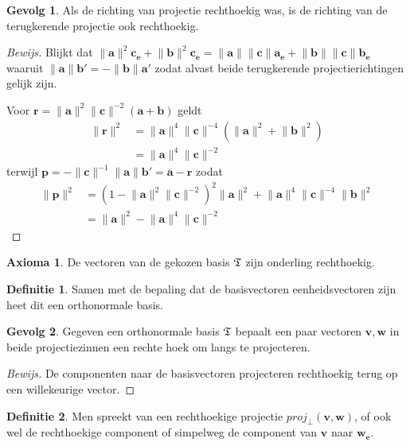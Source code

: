 \documentclass{amsart}
\theoremstyle{definition}
\newtheorem{axm}{Axioma}[section]
\newtheorem{dfn}{Definitie}[section]
\newtheorem{csq}{Gevolg}[section]
\newenvironment{bewijs}{\begin{proof}[Bewijs]}{\end{proof}}
\newcommand{\norm}[1]{\lVert{#1}\rVert}
\newcommand{\vvec}[1][v]{\mathbf{#1}}
\newcommand{\uvec}[1][v]{\vvec[#1]_\mathbf{e}}
\newcommand{\vnorm}[1]{\norm{\vvec[#1]}}
\newcommand{\vecrow}[1][a]{\mathfrak{\MakeUppercase{#1}}}
\begin{document}
\begin{csq}
	Als de richting van projectie rechthoekig was, is de richting van de terugkerende projectie ook rechthoekig.
	\begin{bewijs}
		Blijkt dat $\vnorm a^2\uvec[c] + \vnorm b^2\uvec[c] = \vnorm a\vnorm c\uvec[a] + \vnorm b\vnorm c\uvec[b]$ waaruit $\vnorm a\vvec[b'] = -\vnorm b\vvec[a']$ zodat alvast beide terugkerende projectierichtingen gelijk zijn.

		Voor $\vvec[r] = \vnorm a^2\vnorm c^{-2}(\vvec[a]+\vvec[b])$ geldt
		\begin{align*}
			\vnorm r^2
			 & = \vnorm a^4\vnorm c^{-4}\left(\vnorm a^2 + \vnorm b^2\right) \\
			 & = \vnorm a^4\vnorm c^{-2}
		\end{align*}
		terwijl $\vvec[p] = -\vnorm c^{-1}\vnorm a\vvec[b'] = \vvec[a] - \vvec[r]$ zodat
		\begin{align*}
			\vnorm p^2
			 & = (1 - \vnorm a^2\vnorm c^{-2})^2\vnorm a^2 + \vnorm a^4\vnorm c^{-4}\vnorm b^2 \\
			 & = \vnorm a^2 - \vnorm a^4\vnorm c^{-2}
		\end{align*}
	\end{bewijs}
\end{csq}

\begin{axm}
	De vectoren van de gekozen basis $\vecrow[t]$ zijn onderling rechthoekig.
\end{axm}

\begin{dfn}
	Samen met de bepaling dat de basisvectoren eenheidsvectoren zijn heet dit een orthonormale basis.
\end{dfn}

\begin{csq}
	Gegeven een orthonormale basis $\vecrow[t]$ bepaalt een paar vectoren $\vvec, \vvec[w]$ in beide projectiezinnen een rechte hoek om langs te projecteren.
	\begin{bewijs}
		De componenten naar de basisvectoren projecteren rechthoekig terug op een willekeurige vector.
	\end{bewijs}
\end{csq}

\begin{dfn}
	Men spreekt van een rechthoekige projectie $proj_\perp(\vvec, \vvec[w])$, of ook wel de rechthoekige component of simpelweg de component van $\vvec$ naar $\uvec[w]$.
\end{dfn}
\end{document}
